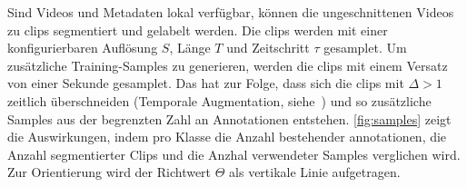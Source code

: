 Sind Videos und Metadaten lokal verfügbar, können die ungeschnittenen Videos zu \glspl{clip} segmentiert und gelabelt werden.
Die \glspl{clip} werden mit einer konfigurierbaren Auflösung $S$, Länge $T$ und Zeitschritt $\tau$ gesamplet.
Um zusätzliche Training-Samples zu generieren, werden die \glspl{clip} mit einem Versatz von einer Sekunde gesamplet.
Das hat zur Folge, dass sich die \glspl{clip} mit $\Delta > 1$ zeitlich überschneiden (Temporale Augmentation, siehe~\cite{Giancola18}) und so zusätzliche Samples aus der begrenzten Zahl an Annotationen entstehen.
\autoref{fig:samples} zeigt die Auswirkungen, indem pro Klasse die Anzahl bestehender \gls{annotationen}, die Anzahl segmentierter Clips und die Anzhal verwendeter Samples verglichen wird.
Zur Orientierung wird der Richtwert $\Theta$ als vertikale Linie aufgetragen.

